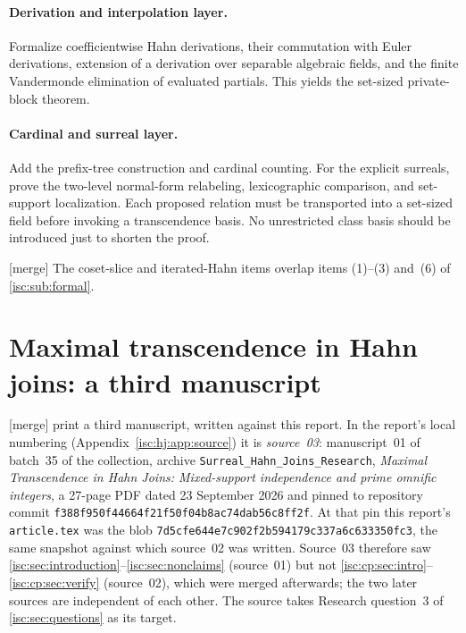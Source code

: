 \documentclass[11pt,letterpaper]{article}
\theoremstyle{definition}
\theoremstyle{remark}
\newcommand{\mtag}{\textup{[merge]}}%
\numberwithin{equation}{section}
\begin{document}
\paragraph{Derivation and interpolation layer.}
Formalize coefficientwise Hahn derivations, their commutation with Euler
derivations, extension of a derivation over separable algebraic fields,
and the finite Vandermonde elimination of evaluated partials. This yields
the set-sized private-block theorem.

\paragraph{Cardinal and surreal layer.}
Add the prefix-tree construction and cardinal counting. For the explicit
surreals, prove the two-level normal-form relabeling, lexicographic
comparison, and set-support localization. Each proposed relation must be
transported into a set-sized field before invoking a transcendence basis.
No unrestricted class basis should be introduced just to shorten the proof.

\mtag{} The coset-slice and iterated-Hahn items overlap items (1)--(3)
and~(6) of \cref{isc:sub:formal}.

\section{Maximal transcendence in Hahn joins: a third manuscript}
\label{isc:hj:sec:intro}

\mtag{} 
print a third manuscript, written against this report. In the report's
local numbering (Appendix~\ref{isc:hj:app:source}) it is \emph{source~03}:
manuscript~01 of batch~35 of the collection, archive
\texttt{Surreal\_Hahn\_Joins\_Research}, \emph{Maximal Transcendence in Hahn
Joins: Mixed-support independence and prime omnific integers}, a 27-page
PDF dated 23 September 2026 and pinned to repository commit
\nolinkurl{f388f950f44664f21f50f04b8ac74dab56c8ff2f}. At that pin this
report's \texttt{article.tex} was the blob
\nolinkurl{7d5cfe644e7c902f2b594179c337a6c633350fc3}, the same snapshot
against which source~02 was written. Source~03 therefore saw
\cref{isc:sec:introduction}--\cref{isc:sec:nonclaims} (source~01) but not
\cref{isc:cp:sec:intro}--\cref{isc:cp:sec:verify} (source~02), which were
merged afterwards; the two later sources are independent of each other. The
source takes Research question~3 of \cref{isc:sec:questions} as its target.
\end{document}
